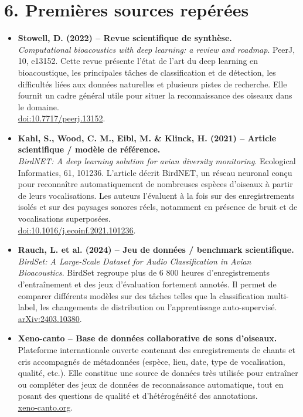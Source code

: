 \documentclass[11pt,a4paper]{article}
\begin{document}
\section*{6. Premières sources repérées}
\begin{itemize}
    \item \textbf{Stowell, D. (2022) -- Revue scientifique de synthèse.}\\
    \textit{Computational bioacoustics with deep learning: a review and roadmap}. PeerJ, 10, e13152. Cette revue présente l'état de l'art du deep learning en bioacoustique, les principales tâches de classification et de détection, les difficultés liées aux données naturelles et plusieurs pistes de recherche. Elle fournit un cadre général utile pour situer la reconnaissance des oiseaux dans le domaine.\\
    \href{https://doi.org/10.7717/peerj.13152}{doi:10.7717/peerj.13152}.

    \item \textbf{Kahl, S., Wood, C. M., Eibl, M. \& Klinck, H. (2021) -- Article scientifique / modèle de référence.}\\
    \textit{BirdNET: A deep learning solution for avian diversity monitoring}. Ecological Informatics, 61, 101236. L'article décrit BirdNET, un réseau neuronal conçu pour reconnaître automatiquement de nombreuses espèces d'oiseaux à partir de leurs vocalisations. Les auteurs l'évaluent à la fois sur des enregistrements isolés et sur des paysages sonores réels, notamment en présence de bruit et de vocalisations superposées.\\
    \href{https://doi.org/10.1016/j.ecoinf.2021.101236}{doi:10.1016/j.ecoinf.2021.101236}.

    \item \textbf{Rauch, L. et al. (2024) -- Jeu de données / benchmark scientifique.}\\
    \textit{BirdSet: A Large-Scale Dataset for Audio Classification in Avian Bioacoustics}. BirdSet regroupe plus de 6 800 heures d'enregistrements d'entraînement et des jeux d'évaluation fortement annotés. Il permet de comparer différents modèles sur des tâches telles que la classification multi-label, les changements de distribution ou l'apprentissage auto-supervisé.\\
    \href{https://arxiv.org/abs/2403.10380}{arXiv:2403.10380}.

    \item \textbf{Xeno-canto -- Base de données collaborative de sons d'oiseaux.}\\
    Plateforme internationale ouverte contenant des enregistrements de chants et cris accompagnés de métadonnées (espèce, lieu, date, type de vocalisation, qualité, etc.). Elle constitue une source de données très utilisée pour entraîner ou compléter des jeux de données de reconnaissance automatique, tout en posant des questions de qualité et d'hétérogénéité des annotations.\\
    \href{https://xeno-canto.org/}{xeno-canto.org}.


\end{itemize}
\end{document}
